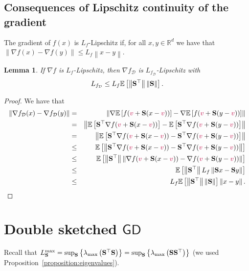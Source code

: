 \documentclass{article}
\newcommand{\shift}{{\color{purple}s}}
\newcommand{\bb}{\mathbb}
\newcommand{\norm}[1]{\left\| #1 \right\|}
\newcommand{\Exp}[1]{{\bb E}\left[#1\right]}
\newtheorem{lemma}{Lemma}
\theoremstyle{plain}
\newcommand{\tf}{f_{\mathcal{D}}}
\renewcommand{\shift}{{\color{purple}v}}
\newcommand{\mS}{{\bf S}}
\theoremstyle{plain}
\theoremstyle{definition}
\theoremstyle{remark}
\begin{document}
\subsection{Consequences of Lipschitz continuity of the gradient}
The gradient of $f(x)$ is $L_f$-Lipschitz if, for all $x,y\in\mathbb{R}^d$ we have that $\left\|\nabla f(x) - \nabla f(y)\right\|\leq L_f\left\|x-y\right\|.$
\begin{lemma}  If $\nabla f$ is $L_f$-Lipschitz, then $\nabla \tf$ is $L_{\tf}$-Lipschitz with
	$$L_{\tf} \leq L_f \Exp{ \norm{\mS^\top} \norm{\mS}}. $$
\end{lemma}
\begin{proof}
	We have that
	\begin{eqnarray*} \norm{\nabla \tf(x) - \nabla \tf(y)}  &=& \norm{ \nabla \Exp{  f( \shift +\mS (x-\shift) )} - \nabla \Exp{ f(\shift +\mS (y - \shift))}} \\
		&=& \norm{\Exp{ \mS^\top \nabla f(\shift + \mS (x - \shift))} - \Exp{ \mS^\top \nabla f(\shift + \mS (y-\shift))}} \\
		&= &\norm{\Exp{ \mS^\top \nabla f(\shift +\mS (x-\shift)) -  \mS^\top \nabla f(\shift +\mS (y - \shift)) }} \\
		&\leq &\Exp{ \norm{  \mS^\top \nabla f(\shift +\mS (x-\shift)) -  \mS^\top \nabla f(\shift +\mS (y - \shift)) } } \\
		&\leq &\Exp{ \norm{\mS^\top} \norm{   \nabla f(\shift +\mS (x-\shift)) -  \nabla f(\shift +\mS (y - \shift)) } } \\
		&\leq &\Exp{ \norm{\mS^\top} L_f \norm{  \mS x - \mS y } } \\
		&\leq &L_f \Exp{ \norm{\mS^\top} \norm{\mS}}\norm{x-y}.
	\end{eqnarray*}
\end{proof}
\clearpage
\section{Double sketched $\mathsf{GD}$}
Recall that $L_{\mS}^{\max} = \sup_{\mS}\left\lbrace\lambda_{\max}\left(\mS^{\top}\mS\right)\right\rbrace=\sup_{\mS}\left\lbrace\lambda_{\max}\left(\mS\mS^{\top}\right)\right\rbrace$ (we used Proposition~\ref{proposition:eigenvalues}).
\end{document}
